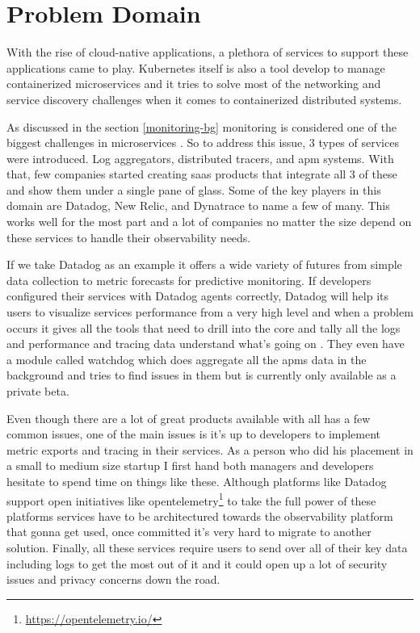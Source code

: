 \section{Problem Domain}

With the rise of cloud-native applications, \citep{CloudAdo16:online} a plethora of services to support these applications came to play. Kubernetes itself is also a tool develop to manage containerized microservices and it tries to solve most of the networking and service discovery challenges when it comes to containerized distributed systems.

As discussed in the section \ref{monitoring-bg} monitoring is considered one of the biggest challenges in microservices \citep{Understa56:online}. So to address this issue, 3 types of services were introduced. Log aggregators, distributed tracers, and \ac{apm} systems. With that, few companies started creating \ac{saas} products that integrate all 3 of these and show them under a single pane of glass. Some of the key players in this domain are Datadog, New Relic, and Dynatrace to name a few of many. This works well for the most part and a lot of companies no matter the size depend on these services to handle their observability needs.

If we take Datadog as an example it offers a wide variety of futures from simple data collection to metric forecasts for predictive monitoring. If developers configured their services with Datadog agents correctly, Datadog will help its users to visualize services performance from a very high level and when a problem occurs it gives all the tools that need to drill into the core and tally all the logs and performance and tracing data understand what's going on \citep{Datadog18:online}. They even have a module called watchdog which does aggregate all the \acp{apm} data in the background and tries to find issues in them but is currently only available as a private beta.

Even though there are a lot of great products available with all has a few common issues, one of the main issues is it's up to developers to implement metric exports and tracing in their services. As a person who did his placement in a small to medium size startup I first hand both managers and developers hesitate to spend time on things like these. Although platforms like Datadog support open initiatives like opentelemetry\footnote{\url{https://opentelemetry.io/}} to take the full power of these platforms services have to be architectured towards the observability platform that gonna get used, once committed it's very hard to migrate to another solution. Finally, all these services require users to send over all of their key data including logs to get the most out of it and it could open up a lot of security issues and privacy concerns down the road.

